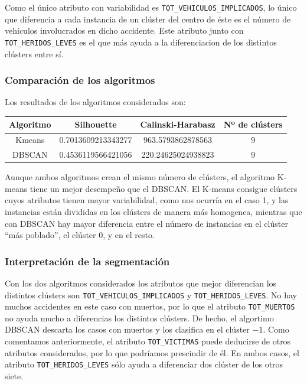 \documentclass[a4]{article}
\begin{document}
Como el único atributo con variabilidad es \texttt{TOT\_VEHICULOS\_IMPLICADOS}, lo único que diferencia a cada instancia de un clúster del centro de éste es el número de vehículos involucrados en dicho accidente. Este atributo junto con \texttt{TOT\_HERIDOS\_LEVES} es el que más ayuda a la diferenciacion de los distintos clústers entre sí.

\subsubsection{Comparación de los algoritmos}

Los resultados de los algoritmos considerados son:

\begin{center}
\begin{tabular}{|c|c|c|c|}
\hline
  \multicolumn{1}{|c|}{\textbf{Algoritmo}} & \textbf{Silhouette} & \textbf{Calinski-Harabasz} &  \textbf{Nº de clústers}\\ \hline
 Kmeans &  0.7013609213343277  & 963.5793862878563  & 9 \\ \hline
 DBSCAN &  0.4536119566421056  & 220.24625024938823 & 9 \\ \hline
\end{tabular}
\end{center}

Aunque ambos algoritmos crean el mismo número de clústers, el algoritmo K-means tiene un mejor desempeño que el DBSCAN. El K-means consigue clústers cuyos atributos tienen mayor variabilidad, como nos ocurría en el caso 1, y las instancias están divididas en los clústers de manera más homogenea, mientras que con DBSCAN hay mayor diferencia entre el número de instancias en el clúster ``más poblado'', el clúster 0, y en el resto.

\subsubsection{Interpretación de la segmentación}

Con los dos algoritmos considerados los atributos que mejor diferencian los distintos clústers son \texttt{TOT\_VEHICULOS\_IMPLICADOS} y \texttt{TOT\_HERIDOS\_LEVES}. No hay muchos accidentes en este caso con muertos, por lo que el atributo \texttt{TOT\_MUERTOS} no ayuda mucho a diferencias los distintos clústers. De hecho, el algortimo DBSCAN descarta los casos con muertos y los clasifica en el clúster $-1$. Como comentamos anteriormente, el atributo \texttt{TOT\_VICTIMAS} puede deducirse de otros atributos considerados, por lo que podríamos prescindir de él. En ambos casos, el atributo \texttt{TOT\_HERIDOS\_LEVES} sólo ayuda a diferenciar dos clúster de los otros siete.
\end{document}
